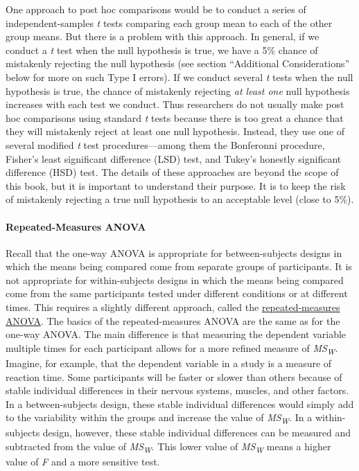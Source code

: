 \documentclass[
]{krantz}
\begin{document}
One approach to post hoc comparisons would be to conduct a series of independent-samples \emph{t} tests comparing each group mean to each of the other group means. But there is a problem with this approach. In general, if we conduct a \emph{t} test when the null hypothesis is true, we have a 5\% chance of mistakenly rejecting the null hypothesis (see section ``Additional Considerations'' below for more on such Type I errors). If we conduct several \emph{t} tests when the null hypothesis is true, the chance of mistakenly rejecting \emph{at least one} null hypothesis increases with each test we conduct. Thus researchers do not usually make post hoc comparisons using standard \emph{t} tests because there is too great a chance that they will mistakenly reject at least one null hypothesis. Instead, they use one of several modified \emph{t} test procedures---among them the Bonferonni procedure, Fisher's least significant difference (LSD) test, and Tukey's honestly significant difference (HSD) test. The details of these approaches are beyond the scope of this book, but it is important to understand their purpose. It is to keep the risk of mistakenly rejecting a true null hypothesis to an acceptable level (close to 5\%).

\hypertarget{repeated-measures-anova}{%
\paragraph*{Repeated-Measures ANOVA}\label{repeated-measures-anova}}

Recall that the one-way ANOVA is appropriate for between-subjects designs in which the means being compared come from separate groups of participants. It is not appropriate for within-subjects designs in which the means being compared come from the same participants tested under different conditions or at different times. This requires a slightly different approach, called the \protect\hyperlink{repeated-measures-anova-1}{repeated-measures ANOVA}. The basics of the repeated-measures ANOVA are the same as for the one-way ANOVA. The main difference is that measuring the dependent variable multiple times for each participant allows for a more refined measure of \emph{MS\textsubscript{W}}. Imagine, for example, that the dependent variable in a study is a measure of reaction time. Some participants will be faster or slower than others because of stable individual differences in their nervous systems, muscles, and other factors. In a between-subjects design, these stable individual differences would simply add to the variability within the groups and increase the value of \emph{MS\textsubscript{W}}. In a within-subjects design, however, these stable individual differences can be measured and subtracted from the value of \emph{MS\textsubscript{W}}. This lower value of \emph{MS\textsubscript{W}} means a higher value of \emph{F} and a more sensitive test.
\end{document}
